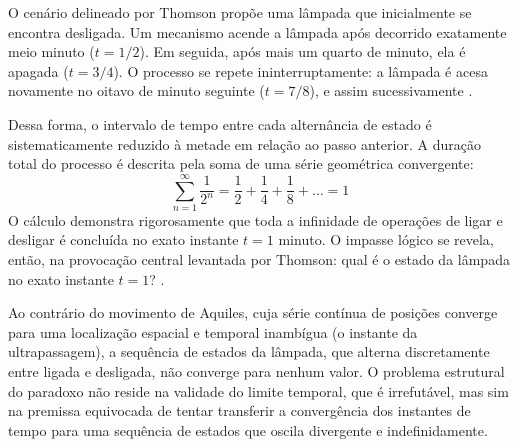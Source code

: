 O cenário delineado por Thomson propõe uma lâmpada que inicialmente se encontra desligada. Um mecanismo acende a lâmpada após decorrido exatamente meio minuto (\(t = 1/2\)). Em seguida, após mais um quarto de minuto, ela é apagada (\(t = 3/4\)). O processo se repete ininterruptamente: a lâmpada é acesa novamente no oitavo de minuto seguinte (\(t = 7/8\)), e assim sucessivamente \parencite[p.~5]{thomson1954}.



Dessa forma, o intervalo de tempo entre cada alternância de estado é sistematicamente reduzido à metade em relação ao passo anterior. A duração total do processo é descrita pela soma de uma série geométrica convergente:
\[
    \sum_{n=1}^{\infty} \frac{1}{2^n} = \frac{1}{2} + \frac{1}{4} + \frac{1}{8} + \dots = 1
\]
O cálculo demonstra rigorosamente que toda a infinidade de operações de ligar e desligar é concluída no exato instante \(t = 1\) minuto. O impasse lógico se revela, então, na provocação central levantada por Thomson: qual é o estado da lâmpada no exato instante \(t=1\)? \parencite[p.~6]{thomson1954}.

Ao contrário do movimento de Aquiles, cuja série contínua de posições converge para uma localização espacial e temporal inambígua (o instante da ultrapassagem), a sequência de estados da lâmpada, que alterna discretamente entre ligada e desligada, não converge para nenhum valor. O problema estrutural do paradoxo não reside na validade do limite temporal, que é irrefutável, mas sim na premissa equivocada de tentar transferir a convergência dos instantes de tempo para uma sequência de estados que oscila divergente e indefinidamente.
